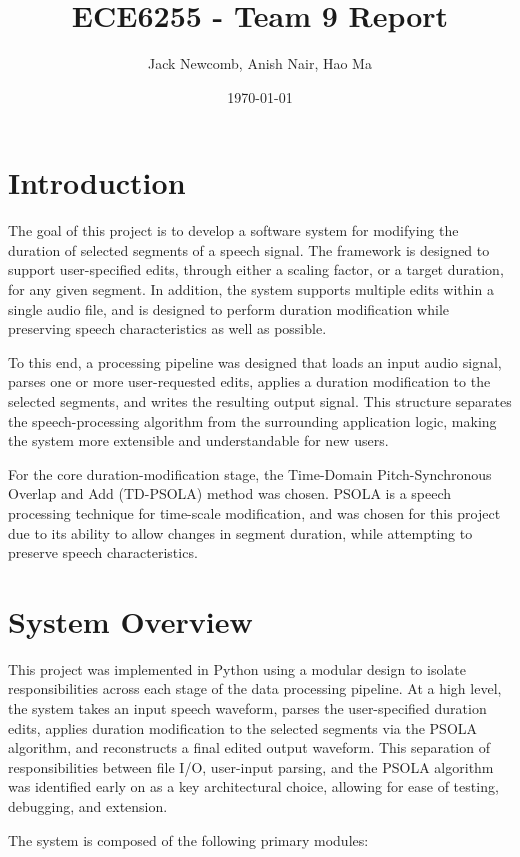 \documentclass{article}
\title{ECE6255 - Team 9 Report}
\author{Jack Newcomb, Anish Nair, Hao Ma}
\date{\today}
\begin{document}
\maketitle

\section{Introduction}

The goal of this project is to develop a software system for modifying the duration of selected segments of a speech signal. The framework is designed to support user-specified edits, through either a scaling factor, or a target duration, for any given segment. In addition, the system supports multiple edits within a single audio file, and is designed to perform duration modification while preserving speech characteristics as well as possible.

To this end, a processing pipeline was designed that loads an input audio signal, parses one or more user-requested edits, applies a duration modification to the selected segments, and writes the resulting output signal. This structure separates the speech-processing algorithm from the surrounding application logic, making the system more extensible and understandable for new users.

For the core duration-modification stage, the Time-Domain Pitch-Synchronous Overlap and Add (TD-PSOLA) method was chosen. PSOLA is a speech processing technique for time-scale modification, and was chosen for this project due to its ability to allow changes in segment duration, while attempting to preserve speech characteristics.

\section{System Overview}

This project was implemented in Python using a modular design to isolate responsibilities across each stage of the data processing pipeline. At a high level, the system takes an input speech waveform, parses the user-specified duration edits, applies duration modification to the selected segments via the PSOLA algorithm, and reconstructs a final edited output waveform. This separation of responsibilities between file I/O, user-input parsing, and the PSOLA algorithm was identified early on as a key architectural choice, allowing for ease of testing, debugging, and extension.

The system is composed of the following primary modules:
\end{document}

